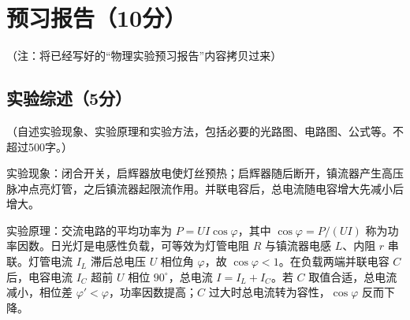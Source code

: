 \documentclass{Phyport}
\begin{document}
\setcounter{page}{1}
\makecover

\section{预习报告（10分）}
（注：将已经写好的“物理实验预习报告”内容拷贝过来）

\subsection{实验综述（5分）}
（自述实验现象、实验原理和实验方法，包括必要的光路图、电路图、公式等。不超过500字。）

实验现象：闭合开关，启辉器放电使灯丝预热；启辉器随后断开，镇流器产生高压脉冲点亮灯管，之后镇流器起限流作用。并联电容后，总电流随电容增大先减小后增大。

实验原理：交流电路的平均功率为 $P=UI\cos\varphi$，其中 $\cos\varphi=P/(UI)$ 称为功率因数。日光灯是电感性负载，可等效为灯管电阻 $R$ 与镇流器电感 $L$、内阻 $r$ 串联。灯管电流 $I_L$ 滞后总电压 $U$ 相位角 $\varphi$，故 $\cos\varphi<1$。在负载两端并联电容 $C$ 后，电容电流 $I_C$ 超前 $U$ 相位 $90^\circ$，总电流 $I=I_L+I_C$。若 $C$ 取值合适，总电流减小，相位差 $\varphi'<\varphi$，功率因数提高；$C$ 过大时总电流转为容性，$\cos\varphi$ 反而下降。
\end{document}
